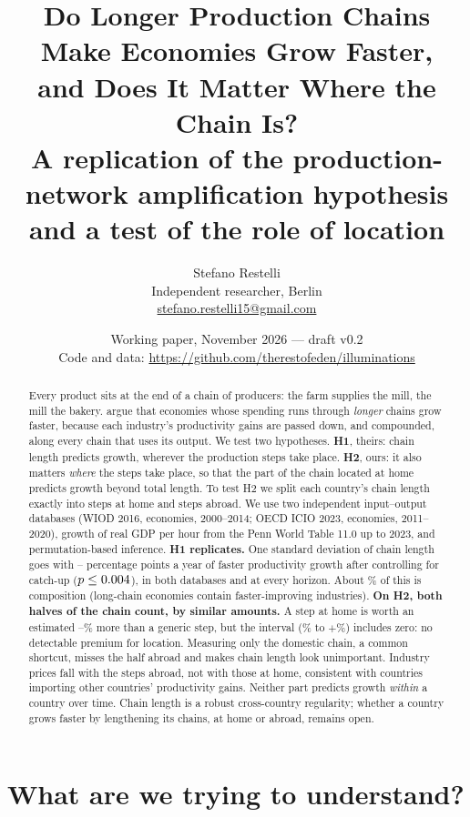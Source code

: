 \documentclass[11pt,a4paper]{article}
\title{\textbf{Do Longer Production Chains Make Economies Grow Faster,\\
and Does It Matter Where the Chain Is?}\\[0.4em]
\large A replication of the production-network amplification hypothesis\\
and a test of the role of location}
\author{Stefano Restelli\\
\small Independent researcher, Berlin\\
\small \href{mailto:stefano.restelli15@gmail.com}{stefano.restelli15@gmail.com}}
\date{\small Working paper, November 2026 --- draft v0.2\\
Code and data: \url{https://github.com/therestofeden/illuminations}}
\begin{document}
\maketitle

\begin{abstract}
\noindent
Every product sits at the end of a chain of producers: the farm supplies the
mill, the mill the bakery. \citet{mcnerney2022} argue that economies whose
spending runs through \emph{longer} chains grow faster, because each industry's
productivity gains are passed down, and compounded, along every chain that uses
its output. We test two hypotheses. \textbf{H1}, theirs: chain length predicts
growth, wherever the production steps take place. \textbf{H2}, ours: it also
matters \emph{where} the steps take place, so that the part of the chain located
at home predicts growth beyond total length. To test H2 we split each country's
chain length exactly into steps at home and steps abroad. We use two independent
input--output databases (WIOD 2016, \NWiod{} economies, 2000--2014; OECD ICIO 2023,
\NIcio{} economies, 2011--2020), growth of real GDP per hour from the Penn World
Table 11.0 up to 2023, and permutation-based inference.
\textbf{H1 replicates.} One standard deviation of chain length goes with
\CatchBetaMin{}--\CatchBetaMax{} percentage points a year of faster productivity
growth after controlling for catch-up ($p\le0.004$), in both databases and at
every horizon. About \AmpShare\% of this is composition (long-chain economies
contain faster-improving industries).
\textbf{On H2, both halves of the chain count, by similar amounts.} A step at home
is worth an estimated \PremMin--\PremMax\% more than a generic step, but the
interval (\PremLoMin\% to $+$\PremHiMax\%) includes zero: no detectable premium for
location. Measuring only the domestic chain, a common shortcut, misses the half
abroad and makes chain length look unimportant. Industry prices fall with the
steps abroad, not with those at home, consistent with countries importing other
countries' productivity gains. Neither part predicts growth \emph{within} a
country over time. Chain length is a robust cross-country regularity; whether a
country grows faster by lengthening its chains, at home or abroad, remains open.
\end{abstract}

\section{What are we trying to understand?}\label{sec:intro}
\end{document}
